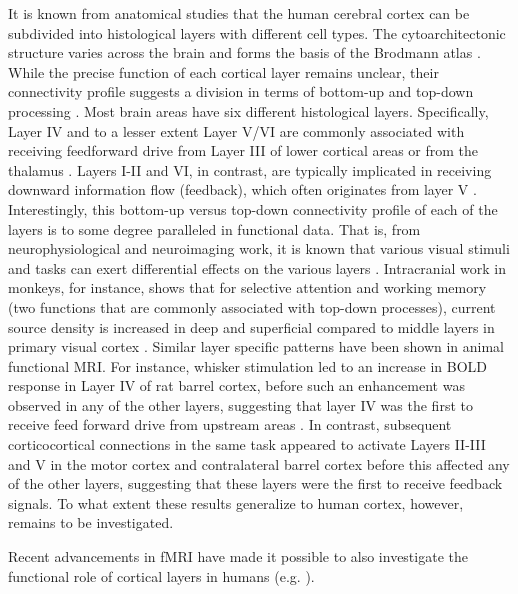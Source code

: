\documentclass[9pt,lineno]{aperture}
\begin{document}
It is known from anatomical studies that the human cerebral cortex can be subdivided into histological layers with different cell types. The cytoarchitectonic structure varies across the brain and forms the basis of the Brodmann atlas \citep{Brodmann1909}. While the precise function of each cortical layer remains unclear, their connectivity profile suggests a division in terms of bottom-up and top-down processing \citep{Felleman1991,Barone2000,Shipp2016}. Most brain areas have six different histological layers. Specifically, Layer IV and to a lesser extent Layer V/VI are commonly associated with receiving feedforward drive from Layer III of lower cortical areas or from the thalamus \citep{Jones1998,Constantinople2013}. Layers I-II and VI, in contrast, are typically implicated in receiving downward information flow (feedback), which often originates from layer V \citep{Alitto2003}. Interestingly, this bottom-up versus top-down connectivity profile of each of the layers is to some degree paralleled in functional data. That is, from neurophysiological and neuroimaging work, it is known that various visual stimuli and tasks can exert differential effects on the various layers \citep{Maier2010,Xing2012,Self2013,VelezFort2014, OHerron2016}. Intracranial work in monkeys, for instance, shows that for selective attention and working memory (two functions that are commonly associated with top-down processes), current source density is increased in deep and superficial compared to middle layers in primary visual cortex \citep{VanKerkoerle2017}. Similar layer specific patterns have been shown in animal functional MRI. For instance, whisker stimulation led to an increase in BOLD response in Layer IV of rat barrel cortex, before such an enhancement was observed in any of the other layers, suggesting that layer IV was the first to receive feed forward drive from upstream areas \citep{Yu2014}. In contrast, subsequent corticocortical connections in the same task appeared to activate Layers II-III and V in the motor cortex and contralateral barrel cortex before this affected any of the other layers, suggesting that these layers were the first to receive feedback signals. To what extent these results generalize to human cortex, however, remains to be investigated.

Recent advancements in fMRI have made it possible to also investigate the functional role of cortical layers in humans (e.g. \citet{Polimeni2010,Maass2014,Kok2016,Lawrence2018,Sharoh2019}). 
\end{document}

